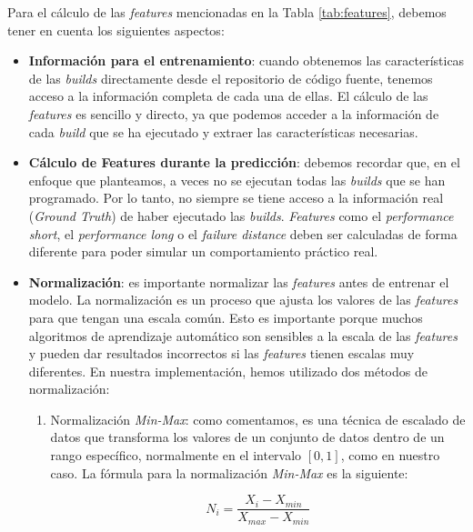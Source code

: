 \noindent Para el cálculo de las \textit{features} mencionadas en la Tabla \ref{tab:features},
debemos tener en cuenta los siguientes aspectos:

\begin{itemize}
    \item \textbf{Información para el entrenamiento}: cuando obtenemos las características de las \textit{builds}
    directamente desde el repositorio de código fuente, tenemos acceso a la información completa
    de cada una de ellas. El cálculo de las \textit{features} es sencillo y directo, ya que
    podemos acceder a la información de cada \textit{build} que se ha ejecutado y extraer las
    características necesarias.\\
    
    \item \textbf{Cálculo de Features durante la predicción}: debemos recordar que, en el
    enfoque que planteamos, a veces no se ejecutan todas las \textit{builds} que se han
    programado. Por lo tanto, no siempre se tiene acceso a la información real (\textit{Ground
    Truth}) de haber ejecutado las \textit{builds}. \textit{Features} como el \textit{performance
    short}, el \textit{performance long} o el \textit{failure distance} deben ser calculadas
    de forma diferente para poder simular un comportamiento práctico real.\\

    \item \textbf{Normalización}: es importante normalizar las \textit{features} antes de
    entrenar el modelo. La normalización es un proceso que ajusta los valores de las
    \textit{features} para que tengan una escala común. Esto es importante porque muchos
    algoritmos de aprendizaje automático son sensibles a la escala de las \textit{features} y
    pueden dar resultados incorrectos si las \textit{features} tienen escalas muy diferentes.
    En nuestra implementación, hemos utilizado dos métodos de normalización:

    \begin{enumerate}
        \item Normalización \textit{Min-Max}: como comentamos, es una técnica de escalado de datos
        que transforma los valores de un conjunto de datos dentro de un rango específico,
        normalmente en el intervalo $[0, 1]$, como en nuestro caso. La fórmula para la
        normalización \textit{Min-Max} es la siguiente:

        \begin{equation}
            N_{i} = \frac{X_{i} - X_{min}}{X_{max} - X_{min}}
        \end{equation}


\end{enumerate}
\end{itemize}
